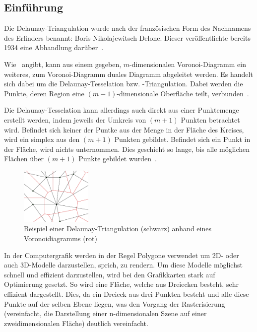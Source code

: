 \subsection{Einführung}
\label{subsec:delaunay-introduction}

Die Delaunay-Triangulation wurde nach der französischen Form des Nachnamens des Erfinders benannt: Boris Nikolajewitsch Delone. Dieser veröffentlichte bereits 1934 eine Abhandlung darüber~\parencite[S. 793 bis 800]{delone1934}.

Wie~\citeauthor{atsuyuki2000spatialtessellations} angibt, kann aus einem gegeben, $m$-dimensionalen Voronoi-Diagramm ein weiteres, zum Voronoi-Diagramm duales Diagramm abgeleitet werden. Es handelt sich dabei um die Delaunay-Tesselation bzw. -Triangulation. Dabei werden die Punkte, deren Region eine $(m-1)$-dimensionale Oberfläche teilt, verbunden~\parencite[S. 53 bis 54]{atsuyuki2000spatialtessellations}.

Die Delaunay-Tesselation kann allerdings auch direkt aus einer Punktemenge erstellt werden, indem jeweils der Umkreis von $(m+1)$ Punkten betrachtet wird. Befindet sich keiner der Puntke aus der Menge in der Fläche des Kreises, wird ein \gls{simplex} aus den $(m+1)$ Punkten gebildet. Befindet sich ein Punkt in der Fläche, wird nichts unternommen. Dies geschieht so lange, bis alle möglichen Flächen über $(m+1)$ Punkte gebildet wurden~\parencite[S. 56]{atsuyuki2000spatialtessellations}.

\begin{figure}[h]
\centering
\includegraphics[width=130px]{images/voronoi_delaunay_example_01.png}
\caption{Beispiel einer Delaunay-Triangulation (schwarz) anhand eines Voronoidiagramms (rot)\protect\footnotemark}
\label{fig:delaunayVoronoiExample}
\end{figure}

In der Computergrafik werden in der Regel Polygone verwendet um 2D- oder auch 3D-Modelle darzustellen, sprich, zu rendern. Um diese Modelle möglichst schnell und effizient darzustellen, wird bei den Grafikkarten stark auf Optimierung gesetzt. So wird eine Fläche, welche aus Dreiecken besteht, sehr effizient dargestellt. Dies, da ein Dreieck aus drei Punkten besteht und alle diese Punkte auf der selben Ebene liegen, was den Vorgang der Rasterisierung (vereinfacht, die Darstellung einer n-dimensionalen Szene auf einer zweidimensionalen Fläche) deutlich vereinfacht.

